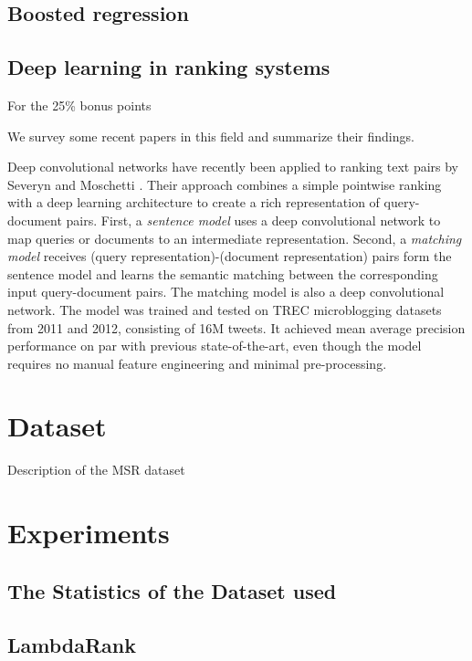 \documentclass[english]{article}
\theoremstyle{definition}
\begin{document}
\subsection{Boosted regression}

\subsection{Deep learning in ranking systems}

For the 25\% bonus points

We survey some recent papers in this field and summarize their findings.

Deep convolutional networks have recently been applied to ranking text pairs by Severyn and Moschetti \cite{severyn2015learning}.  Their approach combines a simple pointwise ranking with a deep learning architecture to create a rich representation of query-document pairs.  First, a \textit{sentence model} uses a deep convolutional network to map queries or documents to an intermediate representation.  Second, a \textit{matching model} receives (query representation)-(document representation) pairs form the sentence model and learns the semantic matching between the corresponding input query-document pairs.  The matching model is also a  deep convolutional network.  The model was trained and tested on TREC microblogging datasets from 2011 and 2012, consisting of 16M tweets.  It achieved mean average precision performance on par with previous state-of-the-art, even though the model requires no manual feature engineering and minimal pre-processing.

\section{Dataset}

Description of the MSR dataset

\section{Experiments}

\subsection{The Statistics of the Dataset used}

\subsection{LambdaRank}
\end{document}
